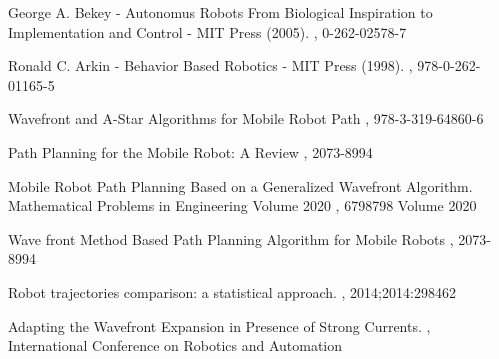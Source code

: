 \documentclass[oneside,twocolumn]{article}
\begin{document}
\newpage
\onecolumn
\begin{thebibliography}{99} %
  
  George A. Bekey - Autonomus Robots From Biological Inspiration to Implementation and Control - MIT Press (2005).
  , 0-262-02578-7

  Ronald C. Arkin - Behavior Based Robotics - MIT Press (1998).
  , 978-0-262-01165-5

  Wavefront and A-Star Algorithms for Mobile Robot Path
  , 978-3-319-64860-6

  Path Planning for the Mobile Robot: A Review
  , 2073-8994 

  Mobile Robot Path Planning Based on a Generalized Wavefront Algorithm. Mathematical Problems in Engineering Volume 2020
  , 6798798 Volume 2020

  Wave front Method Based Path Planning Algorithm for
Mobile Robots
  , 2073-8994 

  Robot trajectories comparison: a statistical approach.
  , 2014;2014:298462

  Adapting the Wavefront Expansion in Presence of Strong Currents.
  , International Conference on Robotics and Automation
  
    
\end{thebibliography}

\end{document}
